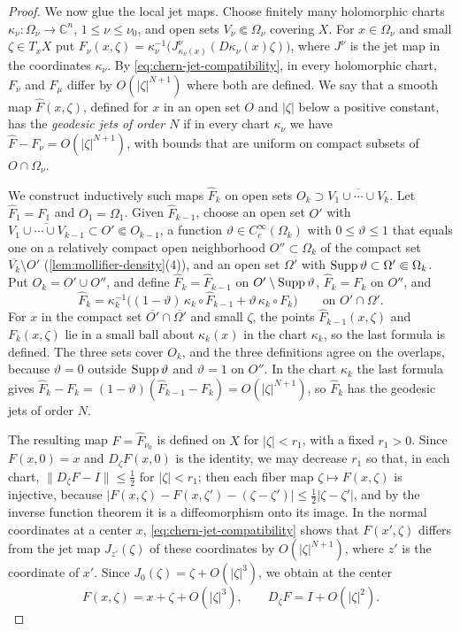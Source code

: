 \begin{proof}
We now glue the local jet maps. Choose finitely many holomorphic charts $\kappa_\nu\colon\Omega_\nu\to\mathbb C^n$, $1\leq\nu\leq\nu_0$, and open sets $V_\nu\Subset\Omega_\nu$ covering $X$. For $x\in\Omega_\nu$ and small $\zeta\in T_xX$ put $F_\nu(x,\zeta)=\kappa_\nu^{-1}\bigl(J^\nu_{\kappa_\nu(x)}(D\kappa_\nu(x)\zeta)\bigr)$, where $J^\nu$ is the jet map in the coordinates $\kappa_\nu$. By \eqref{eq:chern-jet-compatibility}, in every holomorphic chart, $F_\nu$ and $F_\mu$ differ by $O(|\zeta|^{N+1})$ where both are defined. We say that a smooth map $\widehat F(x,\zeta)$, defined for $x$ in an open set $O$ and $|\zeta|$ below a positive constant, has the \emph{geodesic jets of order $N$} if in every chart $\kappa_\nu$ we have $\widehat F-F_\nu=O(|\zeta|^{N+1})$, with bounds that are uniform on compact subsets of $O\cap\Omega_\nu$.

We construct inductively such maps $\widehat F_k$ on open sets $O_k\supset\overline{V_1\cup\cdots\cup V_k}$. Let $\widehat F_1=F_1$ and $O_1=\Omega_1$. Given $\widehat F_{k-1}$, choose an open set $O'$ with $\overline{V_1\cup\cdots\cup V_{k-1}}\subset O'\Subset O_{k-1}$, a function $\vartheta\in C^\infty_c(\Omega_k)$ with $0\leq\vartheta\leq1$ that equals one on a relatively compact open neighborhood $O''\subset\Omega_k$ of the compact set $\overline{V_k}\setminus O'$ (\cref{lem:mollifier-density}(4)), and an open set $\Omega'$ with $\operatorname{Supp}\vartheta\subset\Omega'\Subset\Omega_k$. Put $O_k=O'\cup O''$, and define $\widehat F_k=\widehat F_{k-1}$ on $O'\setminus\operatorname{Supp}\vartheta$, $\widehat F_k=F_k$ on $O''$, and
\[
 \widehat F_k=\kappa_k^{-1}\bigl((1-\vartheta)\,\kappa_k\circ\widehat F_{k-1}+\vartheta\,\kappa_k\circ F_k\bigr)\qquad\text{on }O'\cap\Omega'.
\]
For $x$ in the compact set $\overline{O'}\cap\overline{\Omega'}$ and small $\zeta$, the points $\widehat F_{k-1}(x,\zeta)$ and $F_k(x,\zeta)$ lie in a small ball about $\kappa_k(x)$ in the chart $\kappa_k$, so the last formula is defined. The three sets cover $O_k$, and the three definitions agree on the overlaps, because $\vartheta=0$ outside $\operatorname{Supp}\vartheta$ and $\vartheta=1$ on $O''$. In the chart $\kappa_k$ the last formula gives $\widehat F_k-F_k=(1-\vartheta)(\widehat F_{k-1}-F_k)=O(|\zeta|^{N+1})$, so $\widehat F_k$ has the geodesic jets of order $N$.

The resulting map $F=\widehat F_{\nu_0}$ is defined on $X$ for $|\zeta|<r_1$, with a fixed $r_1>0$. Since $F(x,0)=x$ and $D_\zeta F(x,0)$ is the identity, we may decrease $r_1$ so that, in each chart, $\|D_\zeta F-I\|\leq\frac12$ for $|\zeta|<r_1$; then each fiber map $\zeta\mapsto F(x,\zeta)$ is injective, because $|F(x,\zeta)-F(x,\zeta')-(\zeta-\zeta')|\leq\frac12|\zeta-\zeta'|$, and by the inverse function theorem it is a diffeomorphism onto its image. In the normal coordinates at a center $x$, \eqref{eq:chern-jet-compatibility} shows that $F(x',\zeta)$ differs from the jet map $J_{z'}(\zeta)$ of these coordinates by $O(|\zeta|^{N+1})$, where $z'$ is the coordinate of $x'$. Since $J_0(\zeta)=\zeta+O(|\zeta|^3)$, we obtain at the center
\begin{equation}\label{eq:chern-normal-kernel-map}
 F(x,\zeta)=x+\zeta+O(|\zeta|^3),
 \qquad D_\zeta F=I+O(|\zeta|^2).
\end{equation}


\end{proof}
